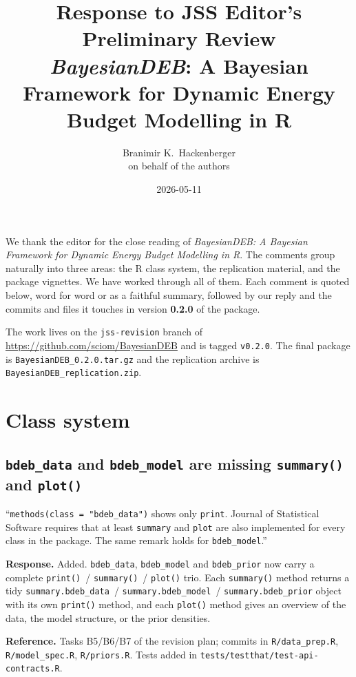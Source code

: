 \documentclass[11pt,a4paper]{article}
\title{Response to JSS Editor's Preliminary Review\\
\large \textit{BayesianDEB}: A Bayesian Framework for Dynamic Energy
Budget Modelling in R}
\author{Branimir K.\ Hackenberger\\ \small on behalf of the authors}
\date{2026-05-11}
\newcommand{\code}[1]{\texttt{#1}}
\begin{document}
\maketitle

We thank the editor for the close reading of \emph{BayesianDEB: A
Bayesian Framework for Dynamic Energy Budget Modelling in R}. The
comments group naturally into three areas: the R class system, the
replication material, and the package vignettes. We have worked through
all of them. Each comment is quoted below, word for word or as a faithful
summary, followed by our reply and the commits and files it touches in
version \textbf{0.2.0} of the package.

The work lives on the \code{jss-revision} branch of
\url{https://github.com/sciom/BayesianDEB} and is tagged \code{v0.2.0}.
The final package is \code{BayesianDEB\_0.2.0.tar.gz} and the replication
archive is \code{BayesianDEB\_replication.zip}.

\section{Class system}

\subsection{\code{bdeb\_data} and \code{bdeb\_model} are missing
\code{summary()} and \code{plot()}}

\begin{displayquote}
``\verb|methods(class = "bdeb_data")| shows only \code{print}.
Journal of Statistical Software requires that at least \code{summary}
and \code{plot} are also implemented for every class in the package.
The same remark holds for \code{bdeb\_model}.''
\end{displayquote}

\textbf{Response.} Added. \code{bdeb\_data}, \code{bdeb\_model} and
\code{bdeb\_prior} now carry a complete
\code{print()}~/ \code{summary()}~/ \code{plot()} trio. Each
\code{summary()} method returns a tidy \code{summary.bdeb\_data}~/
\code{summary.bdeb\_model}~/ \code{summary.bdeb\_prior} object with its
own \code{print()} method, and each \code{plot()} method gives an
overview of the data, the model structure, or the prior densities.

\textbf{Reference.} Tasks B5/B6/B7 of the revision plan; commits in
\code{R/data\_prep.R}, \code{R/model\_spec.R}, \code{R/priors.R}.
Tests added in \code{tests/testthat/test-api-contracts.R}.
\end{document}

